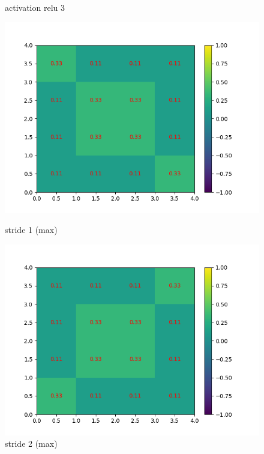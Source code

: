\begin{figure}[h]
        \caption{activation relu 3}
    \endminipage
\end{figure}


\begin{figure}[h]
        \includegraphics[width=\textwidth]{img/cnn_exemple/square/stride_1_max.png}
        \caption{stride 1 (max)}
    \endminipage\hfill
        \includegraphics[width=\textwidth]{img/cnn_exemple/square/stride_2_max.png}
        \caption{stride 2 (max)}
    \endminipage\hfill

\end{figure}
